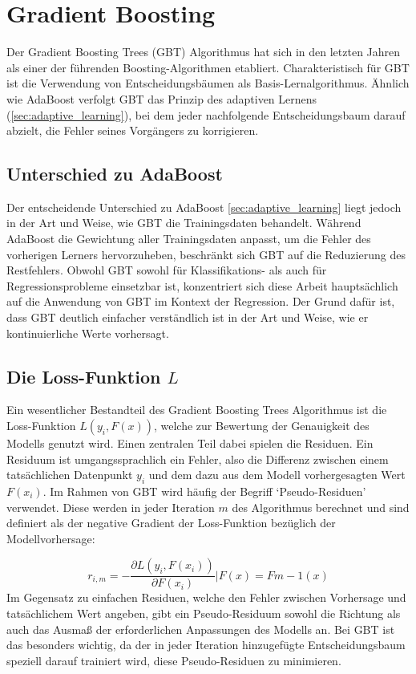 \section{Gradient Boosting}
Der Gradient Boosting Trees (GBT) Algorithmus hat sich in den letzten Jahren als einer der führenden Boosting-Algorithmen etabliert. Charakteristisch für GBT ist die Verwendung von Entscheidungsbäumen als Basis-Lernalgorithmus. Ähnlich wie AdaBoost verfolgt GBT das Prinzip des adaptiven Lernens (\autoref{sec:adaptive_learning}), bei dem jeder nachfolgende Entscheidungsbaum darauf abzielt, die Fehler seines Vorgängers zu korrigieren.

\subsection{Unterschied zu AdaBoost}
Der entscheidende Unterschied zu AdaBoost \ref{sec:adaptive_learning} liegt jedoch in der Art und Weise, wie GBT die Trainingsdaten behandelt. Während AdaBoost die Gewichtung aller Trainingsdaten anpasst, um die Fehler des vorherigen Lerners hervorzuheben, beschränkt sich GBT auf die Reduzierung des Restfehlers.
\newline
Obwohl GBT sowohl für Klassifikations- als auch für Regressionsprobleme einsetzbar ist, konzentriert sich diese Arbeit hauptsächlich auf die Anwendung von GBT im Kontext der Regression. Der Grund dafür ist, dass GBT deutlich einfacher verständlich ist in der Art und Weise, wie er kontinuierliche Werte vorhersagt.


\subsection{Die Loss-Funktion \( L \)}
\label{sec:loss_funtion}
Ein wesentlicher Bestandteil des Gradient Boosting Trees Algorithmus ist die Loss-Funktion \( L(y_i,F(x)) \), welche zur Bewertung der Genauigkeit des Modells genutzt wird. Einen zentralen Teil dabei spielen die Residuen. Ein Residuum ist umgangssprachlich ein Fehler, also die Differenz zwischen einem tatsächlichen Datenpunkt \( y_i \) und dem dazu aus dem Modell vorhergesagten Wert \( F(x_i) \).
Im Rahmen von GBT wird häufig der Begriff `Pseudo-Residuen' verwendet. Diese werden in jeder Iteration \( m \) des Algorithmus berechnet und sind definiert als der negative Gradient der Loss-Funktion bezüglich der Modellvorhersage:

\begin{equation}
    \label{eq:residuum_general}
    r_{i,m} = -\frac{\partial L(y_i, F(x_i))}{\partial F(x_i)}\bigg|{F(x)=F{m-1}(x)}
\end{equation}
Im Gegensatz zu einfachen Residuen, welche den Fehler zwischen Vorhersage und tatsächlichem Wert angeben, gibt ein Pseudo-Residuum sowohl die Richtung als auch das Ausmaß der erforderlichen Anpassungen des Modells an. Bei GBT ist das besonders wichtig, da der in jeder Iteration hinzugefügte Entscheidungsbaum speziell darauf trainiert wird, diese Pseudo-Residuen zu minimieren.

